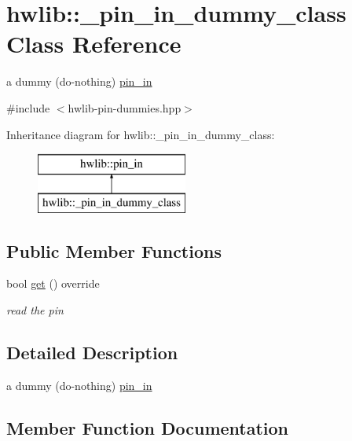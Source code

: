 \hypertarget{classhwlib_1_1__pin__in__dummy__class}{}\section{hwlib\+:\+:\+\_\+pin\+\_\+in\+\_\+dummy\+\_\+class Class Reference}
\label{classhwlib_1_1__pin__in__dummy__class}


a dummy (do-\/nothing) \hyperlink{classhwlib_1_1pin__in}{pin\+\_\+in}  




{\ttfamily \#include $<$hwlib-\/pin-\/dummies.\+hpp$>$}

Inheritance diagram for hwlib\+:\+:\+\_\+pin\+\_\+in\+\_\+dummy\+\_\+class\+:\begin{figure}[H]
\begin{center}
\leavevmode
\includegraphics[height=2.000000cm]{classhwlib_1_1__pin__in__dummy__class}
\end{center}
\end{figure}
\subsection*{Public Member Functions}
\begin{DoxyCompactItemize}
\item 
bool \hyperlink{classhwlib_1_1__pin__in__dummy__class_a2b51c1a0d291cd4414e70504d388c9cb}{get} () override
\begin{DoxyCompactList}\small\item\em read the pin \end{DoxyCompactList}\end{DoxyCompactItemize}


\subsection{Detailed Description}
a dummy (do-\/nothing) \hyperlink{classhwlib_1_1pin__in}{pin\+\_\+in} 

\subsection{Member Function Documentation}
